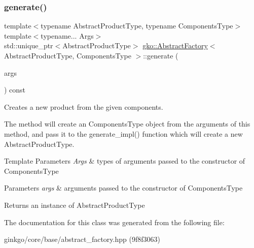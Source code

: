\subsubsection{\texorpdfstring{generate()}{generate()}}
{\footnotesize\ttfamily template$<$typename Abstract\+Product\+Type, typename Components\+Type$>$ \\
template$<$typename... Args$>$ \\
std\+::unique\+\_\+ptr$<$Abstract\+Product\+Type$>$ \hyperlink{classgko_1_1AbstractFactory}{gko\+::\+Abstract\+Factory}$<$ Abstract\+Product\+Type, Components\+Type $>$\+::generate (\begin{DoxyParamCaption}\item[{Args \&\&...}]{args }\end{DoxyParamCaption}) const}



Creates a new product from the given components. 

The method will create an Components\+Type object from the arguments of this method, and pass it to the generate\+\_\+impl() function which will create a new Abstract\+Product\+Type.


\begin{DoxyTemplParams}{Template Parameters}
{\em Args} & types of arguments passed to the constructor of Components\+Type\\
\hline
\end{DoxyTemplParams}

\begin{DoxyParams}{Parameters}
{\em args} & arguments passed to the constructor of Components\+Type\\
\hline
\end{DoxyParams}
\begin{DoxyReturn}{Returns}
an instance of Abstract\+Product\+Type 
\end{DoxyReturn}


The documentation for this class was generated from the following file\+:\begin{DoxyCompactItemize}
\item 
ginkgo/core/base/abstract\+\_\+factory.\+hpp (9f8f3063)\end{DoxyCompactItemize}
